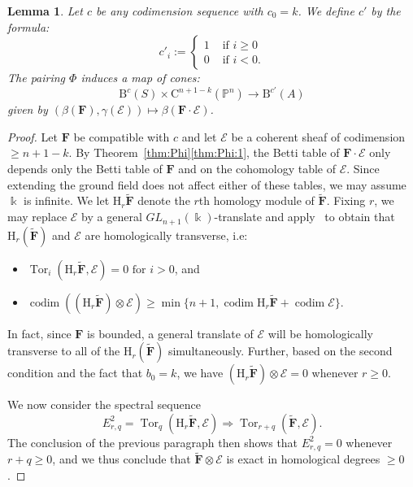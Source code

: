 \documentclass[12pt]{amsart}
\newtheorem{lemma}{Lemma}[section]
\theoremstyle{definition}
\theoremstyle{remark}
\newcommand{\Tor}{\operatorname{Tor}}
\newcommand{\kk}{\Bbbk}
\newcommand{\codim}{\operatorname{codim}}
\newcommand{\PP}{\mathbb{P}}
\newcommand{\HH}{\mathrm{H}}
\newcommand{\bb}{c}
\newcommand{\cE}{\mathcal{E}}
\newcommand{\FF}{\mathbf{F}}
\newcommand{\GL}{{GL}}
\newcommand{\CQ}{\mathrm{C}}
\newcommand{\BBQ}{\mathrm{B}}
\begin{document}
\begin{lemma}\label{lem:refined positivity}
Let $\bb$ be any codimension sequence with $\bb_0=k$.   We define $\bb'$ by the formula:
\[
\bb'_i:=\begin{cases}
1&\text{ if } i\geq 0\\%
0&\text{ if } i<0. %
\end{cases}
\]
The  pairing $\Phi$ induces a map of cones:
\[
\BBQ^{\bb}(S)\times \CQ^{n+1-k}(\PP^n)\to \BBQ^{\bb'}(A)
\]
given by $(\beta(\FF), \gamma(\cE))\mapsto \beta(\FF\cdot \cE)$.
\end{lemma}
\begin{proof}
Let $\FF$ be compatible with $\bb$ and let $\cE$ be a coherent sheaf of codimension $\geq n+1-k$.  By Theorem~\ref{thm:Phi}\eqref{thm:Phi:1}, the Betti table of $\FF\cdot \cE$ only depends only the Betti table of $\FF$ and on the cohomology table of $\cE$.  Since extending the ground field does not affect either of these tables, we may assume $\kk$ is infinite.  We let $\HH_r \widetilde{\FF}$ denote the $r$th homology module of $\widetilde{\FF}$.  Fixing $r$, we may replace $\cE$ by a general $\GL_{n+1}(\kk)$-translate and apply~\cite[Theorem]{miller-speyer} to obtain that $\HH_r(\widetilde{\FF})$ and $\cE$ are homologically transverse, i.e:
\begin{itemize}
	\item $\Tor_i(\HH_r\widetilde{\FF},\cE)=0 \text{ for } i>0$, and
	\item $\codim ((\HH_r\widetilde{\FF})\otimes \cE) \geq \min\{n+1, \codim \HH_r\widetilde{\FF}+\codim \cE\}.$
\end{itemize}
In fact, since $\FF$ is bounded, a general translate of $\cE$ will be homologically transverse to all of the $\HH_r(\widetilde{\FF})$ simultaneously.  Further, based on the second condition and the fact that $b_0=k$, we have $(\HH_r\widetilde{\FF})\otimes \cE=0$ whenever $r\geq 0$.


We now consider the spectral sequence
\[
E^2_{r,q}=\Tor_q(\HH_r\widetilde{\FF},\cE)\Rightarrow \Tor_{r+q}(\widetilde{\FF},\cE).
\]
The conclusion of the previous paragraph then shows that $E^2_{r,q}=0$ whenever $r+q\geq 0$, and we thus conclude that 
$\widetilde{\FF}\otimes \cE$ is exact in homological degrees $\geq 0$.


\end{proof}
\end{document}
